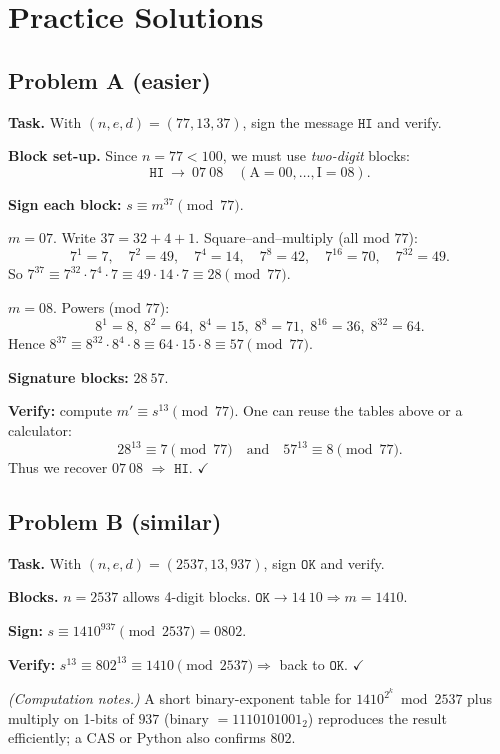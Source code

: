 \documentclass[12pt]{article}
\begin{document}
\section*{Practice Solutions}

\subsection*{Problem A (easier)}
\textbf{Task.} With $(n,e,d)=(77,13,37)$, sign the message \(\texttt{HI}\) and verify.

\textbf{Block set-up.} Since $n=77<100$, we must use \emph{two-digit} blocks:
\[
\texttt{HI}\ \longrightarrow\ 07\ 08 \quad(\text{A}=00,\dots,\text{I}=08).
\]

\textbf{Sign each block:} $s\equiv m^{37}\pmod{77}$.

\underline{$m=07$}. Write $37=32+4+1$.  Square–and–multiply (all mod $77$):
\[
7^1\!=7,\quad 7^2\!=49,\quad 7^4\!=14,\quad 7^8\!=42,\quad 7^{16}\!=70,\quad 7^{32}\!=49.
\]
So \(7^{37}\equiv 7^{32}\!\cdot 7^{4}\!\cdot 7\equiv 49\cdot14\cdot7\equiv 28 \pmod{77}\).

\underline{$m=08$}. Powers (mod $77$):
\[
8^1\!=8,\; 8^2\!=64,\;8^4\!=15,\;8^8\!=71,\;8^{16}\!=36,\;8^{32}\!=64.
\]
Hence \(8^{37}\equiv 8^{32}\!\cdot 8^{4}\!\cdot 8\equiv 64\cdot15\cdot8\equiv 57 \pmod{77}\).

\textbf{Signature blocks:} \(\boxed{28\ 57}\).

\textbf{Verify:} compute $m'\equiv s^{13}\pmod{77}$.  
One can reuse the tables above or a calculator:
\[
28^{13}\equiv 7 \pmod{77}\quad\text{and}\quad 57^{13}\equiv 8 \pmod{77}.
\]
Thus we recover \(07\ 08\) $\Rightarrow$ \(\texttt{HI}\). \(\checkmark\)

\subsection*{Problem B (similar)}
\textbf{Task.} With $(n,e,d)=(2537,13,937)$, sign \(\texttt{OK}\) and verify.

\textbf{Blocks.} $n=2537$ allows 4-digit blocks.  
\(\texttt{OK}\to 14\ 10 \Rightarrow m=1410\).

\textbf{Sign:} \(s\equiv 1410^{937}\pmod{2537}=\boxed{0802}.\)

\textbf{Verify:} \(s^{13}\equiv 802^{13}\equiv 1410\pmod{2537}\Rightarrow\) back to \(\texttt{OK}\). \(\checkmark\)

\emph{(Computation notes.)} A short binary-exponent table for $1410^{2^k}\bmod 2537$ plus multiply on 1-bits of $937$ (binary $=1110101001_2$) reproduces the result efficiently; a CAS or Python also confirms $802$.
\end{document}
